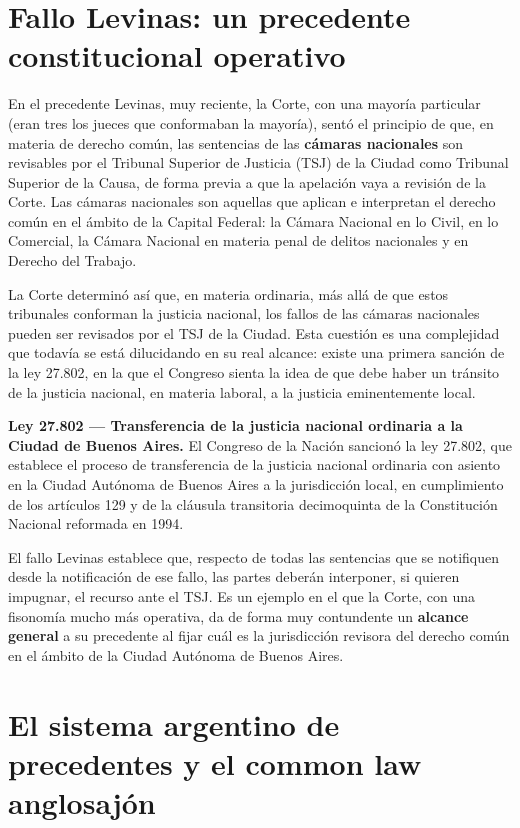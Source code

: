 \documentclass[12pt,oneside]{book}
\begin{document}
\section{Fallo Levinas: un precedente constitucional operativo}

En el precedente Levinas, muy reciente, la Corte, con una mayoría particular (eran tres los jueces que conformaban la mayoría), sentó el principio de que, en materia de derecho común, las sentencias de las \textbf{cámaras nacionales} son revisables por el Tribunal Superior de Justicia (TSJ) de la Ciudad como Tribunal Superior de la Causa, de forma previa a que la apelación vaya a revisión de la Corte. Las cámaras nacionales son aquellas que aplican e interpretan el derecho común en el ámbito de la Capital Federal: la Cámara Nacional en lo Civil, en lo Comercial, la Cámara Nacional en materia penal de delitos nacionales y en Derecho del Trabajo.

La Corte determinó así que, en materia ordinaria, más allá de que estos tribunales conforman la justicia nacional, los fallos de las cámaras nacionales pueden ser revisados por el TSJ de la Ciudad. Esta cuestión es una complejidad que todavía se está dilucidando en su real alcance: existe una primera sanción de la ley 27.802, en la que el Congreso sienta la idea de que debe haber un tránsito de la justicia nacional, en materia laboral, a la justicia eminentemente local.

\begin{note}
\textbf{Ley 27.802 --- Transferencia de la justicia nacional ordinaria a la Ciudad de Buenos Aires.} El Congreso de la Nación sancionó la ley 27.802, que establece el proceso de transferencia de la justicia nacional ordinaria con asiento en la Ciudad Autónoma de Buenos Aires a la jurisdicción local, en cumplimiento de los artículos 129 y de la cláusula transitoria decimoquinta de la Constitución Nacional reformada en 1994.
\end{note}

El fallo Levinas establece que, respecto de todas las sentencias que se notifiquen desde la notificación de ese fallo, las partes deberán interponer, si quieren impugnar, el recurso ante el TSJ. Es un ejemplo en el que la Corte, con una fisonomía mucho más operativa, da de forma muy contundente un \textbf{alcance general} a su precedente al fijar cuál es la jurisdicción revisora del derecho común en el ámbito de la Ciudad Autónoma de Buenos Aires.

\section{El sistema argentino de precedentes y el common law anglosajón}
\end{document}
